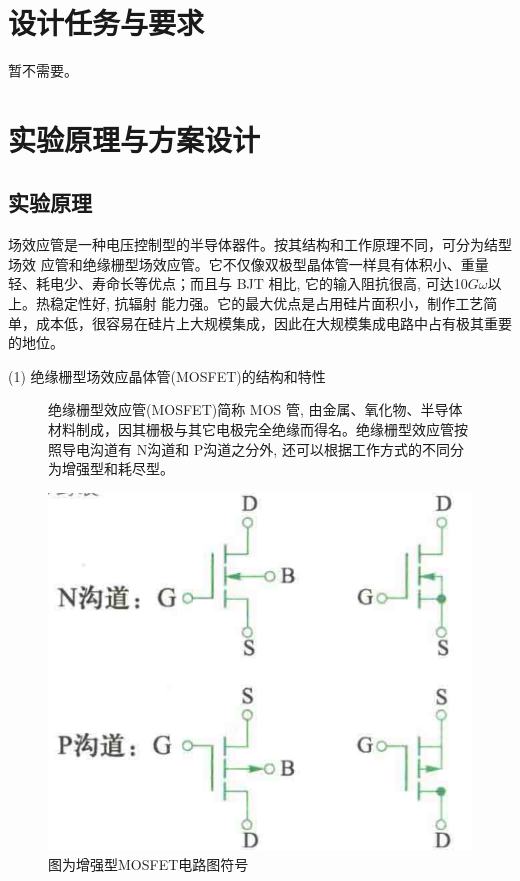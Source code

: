 \documentclass[10pt, a4paper]{article} %
\begin{document}
\section{设计任务与要求}

暂不需要。

\section{实验原理与方案设计}
\subsection{实验原理}
场效应管是一种电压控制型的半导体器件。按其结构和工作原理不同，可分为结型场效 应管和绝缘栅型场效应管。它不仅像双极型晶体管一样具有体积小、重量轻、耗电少、寿命长等优点；而且与 BJT 相比, 它的输入阻抗很高, 可达10$G\omega$以上。热稳定性好, 抗辐射 能力强。它的最大优点是占用硅片面积小，制作工艺简单，成本低，很容易在硅片上大规模集成，因此在大规模集成电路中占有极其重要的地位。

(1) 绝缘栅型场效应晶体管(MOSFET)的结构和特性
\vspace{0.5cm}


\begin{figure}[ht]
    \centering
    \begin{minipage}[ht]{0.46\textwidth}
        \centering
        绝缘栅型效应管(MOSFET)简称 MOS 管, 由金属、氧化物、半导体材料制成，因其栅极与其它电极完全绝缘而得名。绝缘栅型效应管按照导电沟道有 N沟道和 P沟道之分外, 还可以根据工作方式的不同分为增强型和耗尽型。
        
    \end{minipage}
    \hfill
    \begin{minipage}[ht]{0.46\textwidth}
        \centering
        \includegraphics[width=\linewidth]{image/1.png}
        \caption{图为增强型MOSFET电路图符号}
        \label{fig:side:a}
    \end{minipage}
\end{figure}
\end{document}

